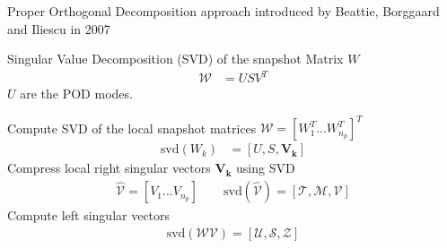 \begin{frame}{Proper Orthogonal Decomposition}
	\Large{}
	\normalsize approach introduced by Beattie, Borggaard and Iliescu in 2007
	
	\vspace{0.25cm}
	Singular Value Decomposition (SVD) of the snapshot Matrix $W$
	\begin{align*}
	\mathcal{W} &= U S V^{T} 
	\end{align*}
	$U$ are the POD modes.
	\vspace{0.25cm}
	
	Compute SVD of the local snapshot matrices $ \mathcal{W} = [W_1^T ... W_{n_p}^T]^T	$
	\begin{align*}
	\text{svd}(W_k) &= [ U,S,\boldsymbol{V_k}]
	\end{align*}
	Compress local right singular vectors $\boldsymbol{V_k}$ using SVD
	\begin{align*}
	\hat{ \mathcal{V} } = [V_1 ... V_{n_p}]
	\qquad
	\text{svd}( \hat{ \mathcal{V} }) = 
	[\mathcal{T},\mathcal{M},\boldsymbol{\mathcal{V}}]
	\end{align*}
	Compute left singular vectors	
	\begin{align*}
	\text{svd}( \mathcal{ W }\mathcal{V} ) =
	[\boldsymbol{\mathcal{U}}, \mathcal{S}, \mathcal{Z}]
	\end{align*}

	
\end{frame}


